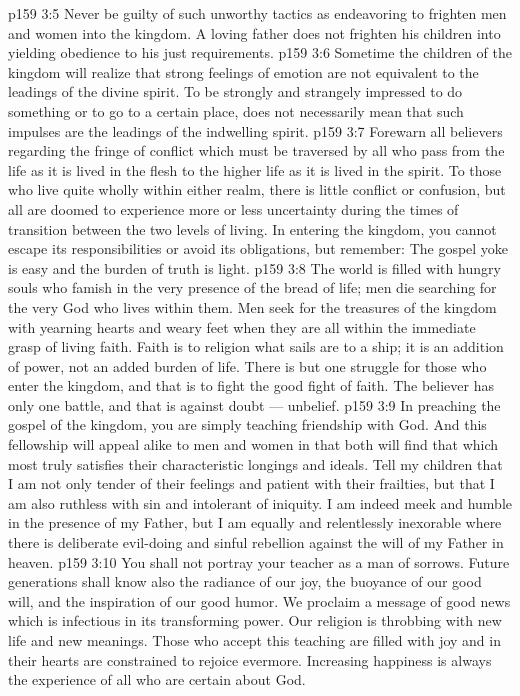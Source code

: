 \vs p159 3:5 Never be guilty of such unworthy tactics as endeavoring to frighten men and women into the kingdom. A loving father does not frighten his children into yielding obedience to his just requirements.
\vs p159 3:6 Sometime the children of the kingdom will realize that strong feelings of emotion are not equivalent to the leadings of the divine spirit. To be strongly and strangely impressed to do something or to go to a certain place, does not necessarily mean that such impulses are the leadings of the indwelling spirit.
\vs p159 3:7 Forewarn all believers regarding the fringe of conflict which must be traversed by all who pass from the life as it is lived in the flesh to the higher life as it is lived in the spirit. To those who live quite wholly within either realm, there is little conflict or confusion, but all are doomed to experience more or less uncertainty during the times of transition between the two levels of living. In entering the kingdom, you cannot escape its responsibilities or avoid its obligations, but remember: The gospel yoke is easy and the burden of truth is light.
\vs p159 3:8 The world is filled with hungry souls who famish in the very presence of the bread of life; men die searching for the very God who lives within them. Men seek for the treasures of the kingdom with yearning hearts and weary feet when they are all within the immediate grasp of living faith. Faith is to religion what sails are to a ship; it is an addition of power, not an added burden of life. There is but one struggle for those who enter the kingdom, and that is to fight the good fight of faith. The believer has only one battle, and that is against doubt --- unbelief.
\vs p159 3:9 In preaching the gospel of the kingdom, you are simply teaching friendship with God. And this fellowship will appeal alike to men and women in that both will find that which most truly satisfies their characteristic longings and ideals. Tell my children that I am not only tender of their feelings and patient with their frailties, but that I am also ruthless with sin and intolerant of iniquity. I am indeed meek and humble in the presence of my Father, but I am equally and relentlessly inexorable where there is deliberate evil\hyp{}doing and sinful rebellion against the will of my Father in heaven.
\vs p159 3:10 You shall not portray your teacher as a man of sorrows. Future generations shall know also the radiance of our joy, the buoyance of our good will, and the inspiration of our good humor. We proclaim a message of good news which is infectious in its transforming power. Our religion is throbbing with new life and new meanings. Those who accept this teaching are filled with joy and in their hearts are constrained to rejoice evermore. Increasing happiness is always the experience of all who are certain about God.
